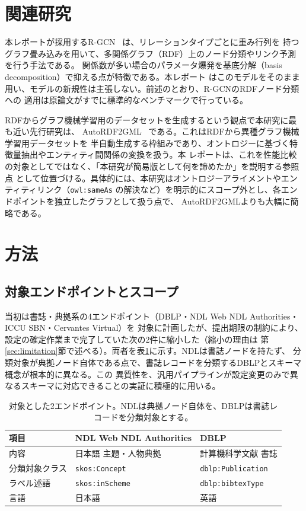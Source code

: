 \documentclass[dvipdfmx,twoside,11pt]{article}
\begin{document}
\section{関連研究}
\label{sec:related}

本レポートが採用するR-GCN~\citep{schlichtkrull2018modeling} は、リレーションタイプごとに重み行列を
持つグラフ畳み込みを用いて、多関係グラフ（RDF）上のノード分類やリンク予測を行う手法である。
関係数が多い場合のパラメータ爆発を基底分解（basis decomposition）で抑える点が特徴である。本レポート
はこのモデルをそのまま用い、モデルの新規性は主張しない。前述のとおり、R-GCNのRDFノード分類への
適用は原論文がすでに標準的なベンチマークで行っている。

RDFからグラフ機械学習用のデータセットを生成するという観点で本研究に最も近い先行研究は、
AutoRDF2GML~\citep{farber2024autordf2gml} である。これはRDFから異種グラフ機械学習用データセットを
半自動生成する枠組みであり、オントロジーに基づく特徴量抽出やエンティティ間関係の変換を扱う。本
レポートは、これを性能比較の対象としてではなく、「本研究が簡易版として何を諦めたか」を説明する参照点
として位置づける。具体的には、本研究はオントロジーアライメントやエンティティリンク（\texttt{owl:sameAs}
の解決など）を明示的にスコープ外とし、各エンドポイントを独立したグラフとして扱う点で、
AutoRDF2GMLよりも大幅に簡略である。

\section{方法}
\label{sec:method}

\subsection{対象エンドポイントとスコープ}

当初は書誌・典拠系の4エンドポイント（DBLP・NDL Web NDL Authorities・ICCU SBN・Cervantes Virtual）を
対象に計画したが、提出期限の制約により、設定の確定作業まで完了していた次の2件に縮小した（縮小の理由は
第\ref{sec:limitation}節で述べる）。両者を表\ref{tab:endpoints}に示す。NDLは書誌ノードを持たず、
分類対象が典拠ノード自体である点で、書誌レコードを分類するDBLPとスキーマ概念が根本的に異なる。この
異質性を、汎用パイプラインが設定変更のみで異なるスキーマに対応できることの実証に積極的に用いる。

\begin{table}[t]
\centering
\caption{対象とした2エンドポイント。NDLは典拠ノード自体を、DBLPは書誌レコードを分類対象とする。}
\label{tab:endpoints}
\begin{tabular}{lll}
\toprule
項目 & NDL Web NDL Authorities & DBLP \\
\midrule
内容 & 日本語 主題・人物典拠 & 計算機科学文献 書誌 \\
分類対象クラス & \texttt{skos:Concept} & \texttt{dblp:Publication} \\
ラベル述語 & \texttt{skos:inScheme} & \texttt{dblp:bibtexType} \\
言語 & 日本語 & 英語 \\
\bottomrule
\end{tabular}
\end{table}
\end{document}
